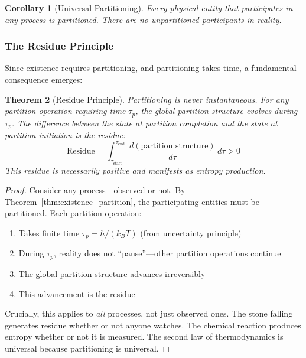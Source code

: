 \documentclass[twocolumn,10pt,a4paper]{article}
\newtheorem{theorem}{Theorem}[section]
\newtheorem{corollary}[theorem]{Corollary}
\theoremstyle{definition}
\theoremstyle{remark}
\begin{document}
\begin{corollary}[Universal Partitioning]
\label{cor:universal_partition}
Every physical entity that participates in any process is partitioned. There are no unpartitioned participants in reality.
\end{corollary}

\subsubsection{The Residue Principle}

Since existence requires partitioning, and partitioning takes time, a fundamental consequence emerges:

\begin{theorem}[Residue Principle]
\label{thm:residue}
Partitioning is never instantaneous. For any partition operation requiring time $\tau_p$, the global partition structure evolves during $\tau_p$. The difference between the state at partition completion and the state at partition initiation is the \emph{residue}:
\begin{equation}
    \text{Residue} = \int_{\tau_{\text{start}}}^{\tau_{\text{end}}} \frac{d(\text{partition structure})}{d\tau} \, d\tau > 0
\end{equation}
This residue is necessarily positive and manifests as entropy production.
\end{theorem}

\begin{proof}
Consider any process---observed or not. By Theorem~\ref{thm:existence_partition}, the participating entities must be partitioned. Each partition operation:
\begin{enumerate}
    \item Takes finite time $\tau_p = \hbar/(k_B T)$ (from uncertainty principle)
    \item During $\tau_p$, reality does not ``pause''---other partition operations continue
    \item The global partition structure advances irreversibly
    \item This advancement is the residue
\end{enumerate}

Crucially, this applies to \emph{all} processes, not just observed ones. The stone falling generates residue whether or not anyone watches. The chemical reaction produces entropy whether or not it is measured. The second law of thermodynamics is universal because partitioning is universal.
\end{proof}
\end{document}
